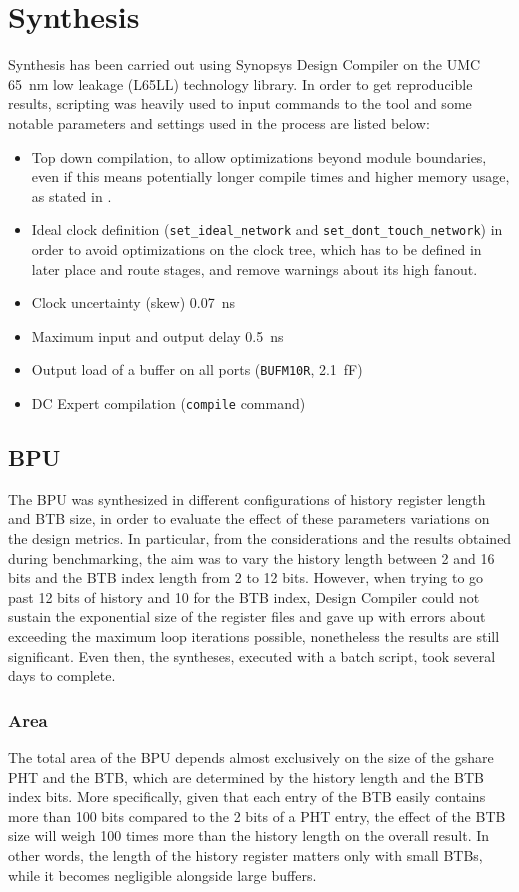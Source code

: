\section{Synthesis}
Synthesis has been carried out using Synopsys Design Compiler on the UMC \SI{65}{nm} low leakage (L65LL) technology library. In order to get reproducible results, scripting was heavily used to input commands to the tool and some notable parameters and settings used in the process are listed below:
\begin{itemize}
  \item Top down compilation, to allow optimizations beyond module boundaries, even if this means potentially longer compile times and higher memory usage, as stated in \cite[p.8-6]{dc}.
  \item Ideal clock definition (\texttt{set\_ideal\_network} and \texttt{set\_dont\_touch\_network}) in order to avoid optimizations on the clock tree, which has to be defined in later place and route stages, and remove warnings about its high fanout.
  \item Clock uncertainty (skew) \SI{0.07}{ns}
  \item Maximum input and output delay \SI{0.5}{ns}
  \item Output load of a buffer on all ports (\texttt{BUFM10R}, \SI{2.1}{\femto\farad})
  \item DC Expert compilation (\texttt{compile} command)
\end{itemize}

\subsection{\acs{BPU}}
The \ac{BPU} was synthesized in different configurations of history register length and \ac{BTB} size, in order to evaluate the effect of these parameters variations on the design metrics. In particular, from the considerations and the results obtained during benchmarking, the aim was to vary the history length between 2 and 16 bits and the \ac{BTB} index length from 2 to 12 bits. However, when trying to go past 12 bits of history and 10 for the \ac{BTB} index, Design Compiler could not sustain the exponential size of the register files and gave up with errors about exceeding the maximum loop iterations possible, nonetheless the results are still significant. Even then, the syntheses, executed with a batch script, took several days to complete.

\subsubsection{Area}
The total area of the \ac{BPU} depends almost exclusively on the size of the gshare \ac{PHT} and the \ac{BTB}, which are determined by the history length and the \ac{BTB} index bits. More specifically, given that each entry of the \ac{BTB} easily contains more than 100 bits compared to the 2 bits of a \ac{PHT} entry, the effect of the \ac{BTB} size will weigh 100 times more than the history length on the overall result. In other words, the length of the history register matters only with small \acp{BTB}, while it becomes negligible alongside large buffers.

